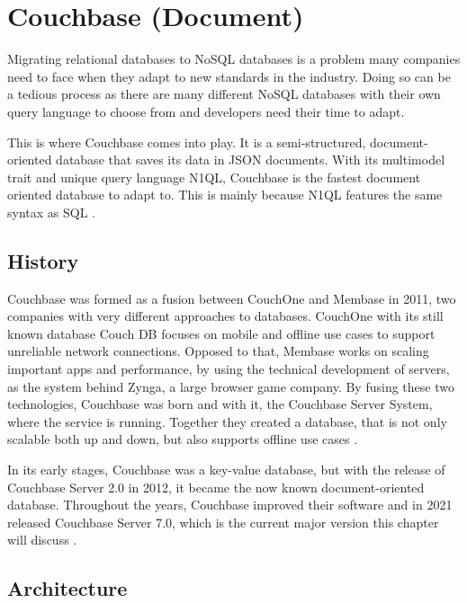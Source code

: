
\chapter{Couchbase (Document)} \label{ch:couchbase}

Migrating relational databases to \ac{NoSQL} databases is a problem many companies need to face when they adapt to new standards in the industry. Doing so can be a tedious process as there are many different \ac{NoSQL} databases with their own query language to choose from and developers need their time to adapt.

This is where Couchbase comes into play. It is a semi-structured, document-oriented database that saves its data in \ac{JSON} documents. With its multimodel trait and unique query language \ac{N1QL}, Couchbase is the fastest document oriented database to adapt to. This is mainly because \ac{N1QL} features the same syntax as \ac{SQL} \parencite{BigdataInsiderOnCouchbase}.

\section{History}

Couchbase was formed as a fusion between CouchOne and Membase in 2011, two companies with very different approaches to databases. CouchOne with its still known database Couch DB focuses on mobile and offline use cases to support unreliable network connections. Opposed to that, Membase works on scaling important apps and performance, by using the technical development of servers, as the system behind Zynga, a large browser game company. By fusing these two technologies, Couchbase was born and with it, the Couchbase Server System, where the service is running. Together they created a database, that is not only scalable both up and down, but also supports offline use cases \parencite{CouchOne-Membase-Fusion}.

In its early stages, Couchbase was a key-value database, but with the release of Couchbase Server 2.0 in 2012, it became the now known document-oriented database. Throughout the years, Couchbase improved their software and in 2021 released Couchbase Server 7.0, which is the current major version this chapter will discuss \parencite{CouchbaseAbout}.

\section{Architecture}

